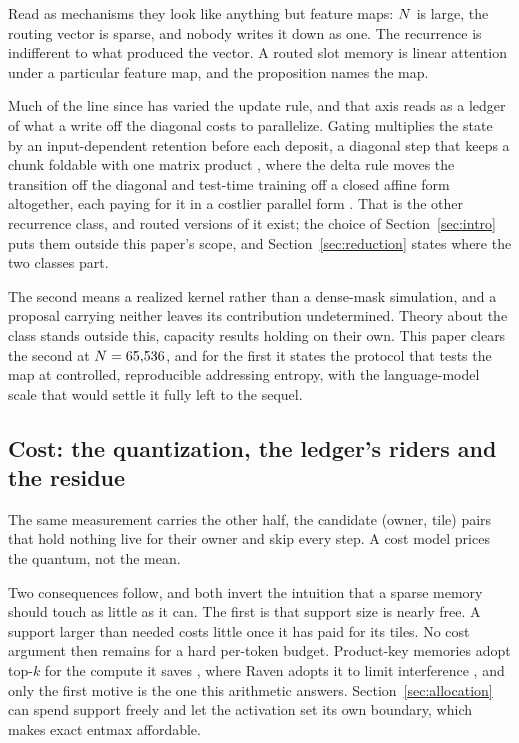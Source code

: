 Read as mechanisms they look like anything but feature maps: $N$ is large, the routing vector is sparse, and nobody writes it down as one. The recurrence is indifferent to what produced the vector. A routed slot memory is linear attention under a particular feature map, and the proposition names the map.

Much of the line since has varied the update rule, and that axis reads as a ledger of what a write off the diagonal costs to parallelize. Gating multiplies the state by an input-dependent retention before each deposit, a diagonal step that keeps a chunk foldable with one matrix product \citep{yang2024gla, gu2023mamba, qin2024hgrn2}, where the delta rule moves the transition off the diagonal and test-time training off a closed affine form altogether, each paying for it in a costlier parallel form \citep{schlag2021fwp, yang2024deltanet, wang2025testtime}. That is the other recurrence class, and routed versions of it exist; the choice of Section~\ref{sec:intro} puts them outside this paper's scope, and Section~\ref{sec:reduction} states where the two classes part.

The second means a realized kernel rather than a dense-mask simulation, and a proposal carrying neither leaves its contribution undetermined. Theory about the class stands outside this, capacity results holding on their own. This paper clears the second at $N = 65{,}536$, and for the first it states the protocol that tests the map at controlled, reproducible addressing entropy, with the language-model scale that would settle it fully left to the sequel.

\subsection{Cost: the quantization, the ledger's riders and the residue}
\label{apd:costdev}

The same measurement carries the other half, the candidate (owner, tile) pairs that hold nothing live for their owner and skip every step. A cost model prices the quantum, not the mean.

Two consequences follow, and both invert the intuition that a sparse memory should touch as little as it can. The first is that support size is nearly free. A support larger than needed costs little once it has paid for its tiles. No cost argument then remains for a hard per-token budget. Product-key memories adopt top-$k$ for the compute it saves \citep{lample2019pkm}, where Raven adopts it to limit interference \citep{afzal2026raven}, and only the first motive is the one this arithmetic answers. Section~\ref{sec:allocation} can spend support freely and let the activation set its own boundary, which makes exact entmax affordable.

